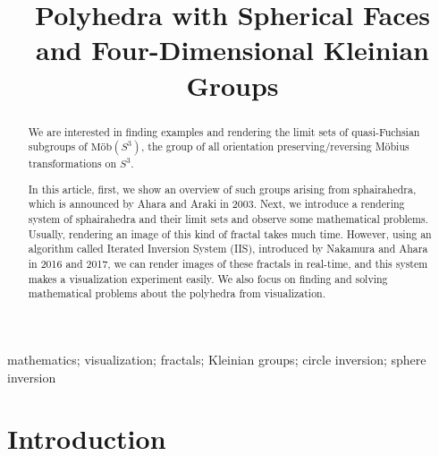 \documentclass[suppldata, dvipdfmx]{interact}
\date{\empty}
\theoremstyle{plain}%
\theoremstyle{definition}
\theoremstyle{remark}
\theoremstyle{problemstyle}
\begin{document}

\title{Polyhedra with Spherical Faces and Four-Dimensional Kleinian Groups}

\author{
}

\maketitle

\begin{abstract}
We are interested in finding examples and rendering the limit sets of
quasi-Fuchsian subgroups of $\text{M\"ob}(S^3)$, the group of all
orientation preserving/reversing M\"obius transformations on $S^3$. 

In this article, first, we show an overview of such groups arising from
sphairahedra, which is announced by Ahara and Araki in 2003.
Next, we introduce a rendering system of sphairahedra and their limit
sets and observe some mathematical problems. 
Usually, rendering an image of this kind of fractal takes much time.
However, using an algorithm called Iterated Inversion System (IIS),
introduced by Nakamura and Ahara in 2016 and 2017,
we can render images of these fractals in real-time, and this system
makes a visualization experiment easily. We also focus on finding and
solving mathematical problems about the polyhedra from visualization.

\end{abstract}

\begin{keywords}
mathematics; visualization; fractals; Kleinian groups; circle inversion;
 sphere inversion
\end{keywords}


\section{Introduction}
\end{document}
